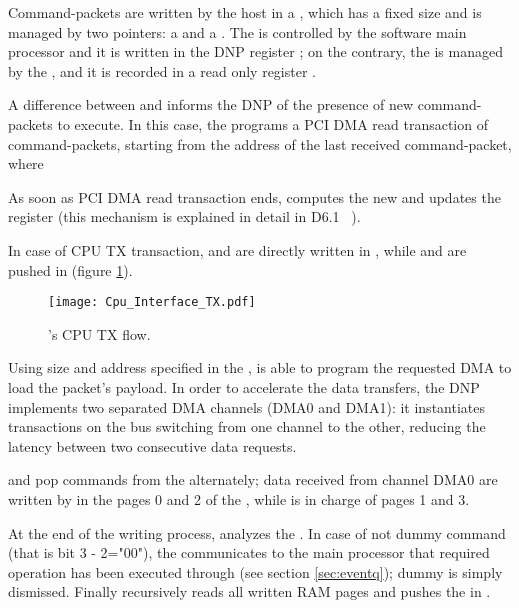 Command-packets are written by the host in a \ringbuffer, which has a
fixed size and is managed by two pointers: a \writepointer and a
\readpointer.  The \writepointer is controlled by the software main
processor and it is written in the DNP register \wrptr; on the
contrary, the \readpointer is managed by the , and
it is recorded in a read only register \rdptr.

A difference between \wrptr and \rdptr informs the DNP of the presence
of new command-packets to execute. 
In this case, the  programs a PCI DMA read
transaction of  command-packets, starting from the address of the
last received command-packet, where
 
As soon as PCI DMA read transaction ends,  computes
the new \ringbuffer \readpointer and updates the \rdptr register (this
mechanism is explained in detail in D6.1 ~\cite{euretile:D6_1}).

In case of CPU TX transaction, \header and \footer are directly
written in , while  and  are
pushed in  (figure \ref{fig:TX_CPU}).

\begin{figure}[!hbt]
  \centering
  \texttt{[image: Cpu\_Interface\_TX.pdf]}
  \caption{\apenetp's CPU TX flow.}
  \label{fig:TX_CPU}
\end{figure}

Using size and address specified in the ,  is
able to program the requested DMA to load the packet's payload. In
order to accelerate the data transfers, the DNP implements two
separated DMA channels (DMA0 and DMA1): it instantiates transactions
on the \PCIe bus switching from one channel to the other, reducing the
latency between two consecutive data requests.

 and  pop commands from the  alternately; data received from channel DMA0 are written by
 in the pages 0 and 2 of the , while
 is in charge of pages 1 and 3.

At the end of the  writing process, 
analyzes the .
In case of not dummy command (that is  bit 3 - 2="00"), the
 communicates to the main processor that required
operation has been executed through  (see
section \ref{sec:eventq}); dummy  is simply dismissed.
Finally  recursively reads all written RAM pages and
pushes the \payload in .

